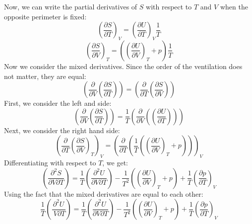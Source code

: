 \documentclass{article}
\begin{document}
Now, we can write the partial derivatives of \(S\) with respect to \(T\) and \(V\) when the opposite perimeter is fixed:
\begin{equation}
\left( \frac{\partial S}{\partial T} \right)_V = \left( \frac{\partial U}{\partial T} \right)_V \frac{1}{T}
\end{equation}
\begin{equation}
\left( \frac{\partial S}{\partial V} \right)_T = \left( \left( \frac{\partial U}{\partial V} \right)_T + p \right) \frac{1}{T}
\end{equation}
Now we consider the mixed derivatives. Since the order of the ventilation does not matter, they are equal:
\begin{equation}
\left( \frac{\partial}{\partial V} \left( \frac{\partial S}{\partial T} \right) \right) = \left( \frac{\partial}{\partial T} \left( \frac{\partial S}{\partial V} \right) \right)
\end{equation}
First, we consider the left and side:
\begin{equation}
\left( \frac{\partial}{\partial V} \left( \frac{\partial S}{\partial T} \right) \right) = \frac{1}{T} \left( \frac{\partial}{\partial V} \left( \left( \frac{\partial U}{\partial T} \right) \right) \right)
\end{equation}
Next, we consider the right hand side:
\begin{equation}
\left( \frac{\partial}{\partial T} \left( \frac{\partial S}{\partial V} \right)_T \right)_V = \left( \frac{\partial}{\partial T} \left( \frac{1}{T} \left( \left( \frac{\partial U}{\partial V} \right)_T + p \right) \right) \right)_V
\end{equation}
Differentiating with respect to $T$, we get:
\begin{equation}
    \left( \frac{\partial^2 S}{\partial V \partial T} \right) = \frac{1}{T} \left( \frac{\partial^2 U}{\partial V \partial T} \right) - \frac{1}{T^2} \left( \left( \frac{\partial U}{\partial V} \right)_T  + p \right) + \frac{1}{T} \left( \frac{\partial p}{\partial T} \right)_V
\end{equation}
Using the fact that the mixed derivatives are equal to each other:
\begin{equation}
    \frac{1}{T} \left( \frac{\partial^2 U}{\ V \partial T}\right) = \frac{1}{T} \left( \frac{\partial^2 U}{\partial V \partial T} \right) - \frac{1}{T^2} \left( \left( \frac{\partial U}{\partial V} \right)_T  + p \right) + \frac{1}{T} \left( \frac{\partial p}{\partial T} \right)_V
\end{equation}
\end{document}

